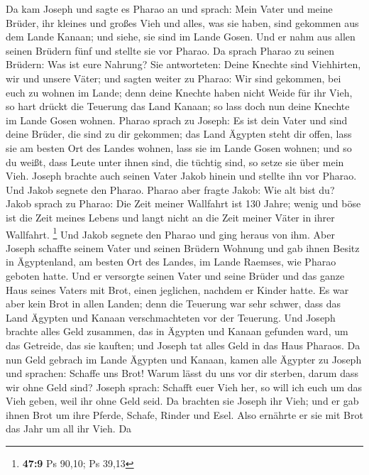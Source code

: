  Da kam Joseph und sagte es Pharao an und sprach: Mein Vater
und meine Brüder, ihr kleines und großes Vieh und alles, was sie haben,
sind gekommen aus dem Lande Kanaan; und siehe, sie sind im Lande Gosen.
 Und er nahm aus allen seinen Brüdern fünf und stellte sie
vor Pharao.  Da sprach Pharao zu seinen Brüdern: Was ist
eure Nahrung? Sie antworteten: Deine Knechte sind Viehhirten, wir und
unsere Väter;  und sagten weiter zu Pharao: Wir sind
gekommen, bei euch zu wohnen im Lande; denn deine Knechte haben nicht
Weide für ihr Vieh, so hart drückt die Teuerung das Land Kanaan; so lass
doch nun deine Knechte im Lande Gosen wohnen.  Pharao sprach
zu Joseph: Es ist dein Vater und sind deine Brüder, die sind zu dir
gekommen;  das Land Ägypten steht dir offen, lass sie am
besten Ort des Landes wohnen, lass sie im Lande Gosen wohnen; und so du
weißt, dass Leute unter ihnen sind, die tüchtig sind, so setze sie über
mein Vieh.  Joseph brachte auch seinen Vater Jakob hinein
und stellte ihn vor Pharao. Und Jakob segnete den Pharao. 
Pharao aber fragte Jakob: Wie alt bist du?  Jakob sprach zu
Pharao: Die Zeit meiner Wallfahrt ist 130 Jahre; wenig und böse ist die
Zeit meines Lebens und langt nicht an die Zeit meiner Väter in ihrer
Wallfahrt. \footnote{\textbf{47:9} Ps 90,10; Ps 39,13}  Und
Jakob segnete den Pharao und ging heraus von ihm.  Aber
Joseph schaffte seinem Vater und seinen Brüdern Wohnung und gab ihnen
Besitz in Ägyptenland, am besten Ort des Landes, im Lande Raemses, wie
Pharao geboten hatte.  Und er versorgte seinen Vater und
seine Brüder und das ganze Haus seines Vaters mit Brot, einen jeglichen,
nachdem er Kinder hatte.  Es war aber kein Brot in allen
Landen; denn die Teuerung war sehr schwer, dass das Land Ägypten und
Kanaan verschmachteten vor der Teuerung.  Und Joseph
brachte alles Geld zusammen, das in Ägypten und Kanaan gefunden ward, um
das Getreide, das sie kauften; und Joseph tat alles Geld in das Haus
Pharaos.  Da nun Geld gebrach im Lande Ägypten und Kanaan,
kamen alle Ägypter zu Joseph und sprachen: Schaffe uns Brot! Warum lässt
du uns vor dir sterben, darum dass wir ohne Geld sind? 
Joseph sprach: Schafft euer Vieh her, so will ich euch um das Vieh
geben, weil ihr ohne Geld seid.  Da brachten sie Joseph ihr
Vieh; und er gab ihnen Brot um ihre Pferde, Schafe, Rinder und Esel.
Also ernährte er sie mit Brot das Jahr um all ihr Vieh.  Da
